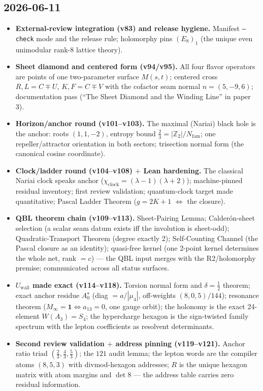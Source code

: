 \documentclass[11pt]{article}
\begin{document}
\subsection*{2026-06-11}
\begin{itemize}
\item \textbf{External-review integration (v83) and release hygiene.} Manifest
  \texttt{--check} mode and the release rule; holomorphy pins $(E_8)_1$ (the unique even
  unimodular rank-8 lattice theory).
\item \textbf{Sheet diamond and centered form (v94/v95).} All four flavor operators are
  points of one two-parameter surface $M(s,t)$; centered cross $R,L=C\mp U$, $K,F=C\mp V$
  with the cofactor seam normal $n=(5,-9,6)$; documentation pass (``The Sheet Diamond and
  the Winding Line'' in paper 3).
\item \textbf{Horizon/anchor round (v101--v103).} The maximal (Nariai) black hole is the
  anchor: roots $(1,1,-2)$, entropy bound $\tfrac23=|\mathbb Z_2|/N_{\mathrm{fam}}$; one
  repeller/attractor orientation in both sectors; trisection normal form (the canonical
  cosine coordinate).
\item \textbf{Clock/ladder round (v104--v108) $+$ Lean hardening.} The classical Nariai
  clock speaks anchor ($\chi_{\mathrm{clock}}=(\lambda-1)(\lambda+2)$); machine-pinned
  residual inventory; first review validation; quantum-clock target made quantitative;
  Pascal Ladder Theorem ($g=2K+1$ $\Leftrightarrow$ the closure).
\item \textbf{QBL theorem chain (v109--v113).} Sheet-Pairing Lemma; Calder\'on-sheet
  selection (a scalar seam datum exists iff the involution is sheet-odd); Quadratic-Transport
  Theorem (degree exactly 2); Self-Counting Channel (the Pascal closure as an identity);
  quasi-free kernel (one 2-point kernel determines the whole net, rank $=c$) --- the QBL
  input merges with the R2/holomorphy premise; communicated across all status surfaces.
\item \textbf{$U_{\mathrm{wall}}$ made exact (v114--v118).} Torsion normal form and
  $\delta=\tfrac12$ theorem; exact anchor residue $A_0^\star$ (diag $=a/|\mu_4|$,
  off-weights $(8,0,5)/144$); resonance theorem ($M_\infty=\mathbf 1\iff a_{13}=0$, one gauge
  orbit); the holonomy is the exact 24-element $W(A_3)=S_4$; the hypercharge hexagon is the
  sign-twisted family spectrum with the lepton coefficients as resolvent determinants.
\item \textbf{Second review validation $+$ address pinning (v119--v121).} Anchor ratio triad
  $(\tfrac23,\tfrac43,\tfrac53)$; the $121$ audit lemma; the lepton words are the compiler
  atoms $(8,5,3)$ with divmod-hexagon addresses; $R$ is the unique hexagon matrix with atom
  margins and $\det 8$ --- the address table carries zero residual information.
\end{itemize}
\end{document}
